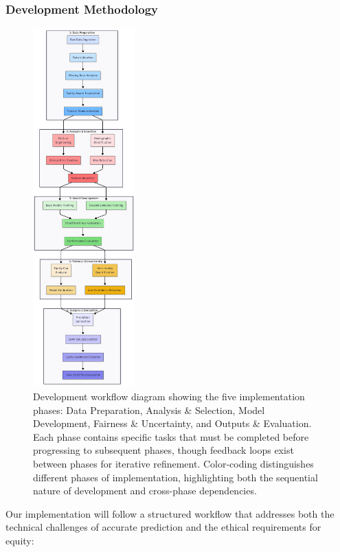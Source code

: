 \subsubsection{Development Methodology}

\begin{figure}[H]
    \centering
    \includegraphics[width=0.35\textwidth]{figures/DevelopmentWorkflow.png}
    \caption{Development workflow diagram showing the five implementation phases: Data Preparation, Analysis \& Selection, Model Development, Fairness \& Uncertainty, and Outputs \& Evaluation. Each phase contains specific tasks that must be completed before progressing to subsequent phases, though feedback loops exist between phases for iterative refinement. Color-coding distinguishes different phases of implementation, highlighting both the sequential nature of development and cross-phase dependencies.}
    \label{fig:development_workflow}
\end{figure}

Our implementation will follow a structured workflow that addresses both the technical challenges of accurate prediction and the ethical requirements for equity:

